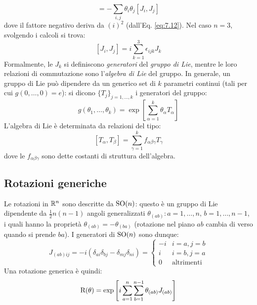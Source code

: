 \begin{equation}
	[\tens{A},\tens{B}] = - \sum_{i,j} \theta_i \theta_j \left[ J_i, J_j \right]
	\label{eq:7.14}
\end{equation}
dove il fattore negativo deriva da $ \left( i \right)^2 $ (dall'Eq. \ref{eq:7.12}).
Nel caso $ n = 3 $, svolgendo i calcoli si trova:
\begin{equation}
	\left[ J_i, J_j \right] = i \sum_{k = 1}^{3} \epsilon_{ijk} J_k
	\label{eq:7.15}
\end{equation}
Formalmente, le $ J_k $ si definiscono \textit{generatori} del \textit{gruppo di Lie}, mentre le loro relazioni di commutazione sono l'\textit{algebra di Lie} del gruppo. In generale, un gruppo di Lie può dipendere da un generico set di $ k $ parametri continui (tali per cui $ g(0,\dots,0) = e $): si dicono $ \{T_j\}_{j = 1,\dots,k} $ i generatori del gruppo:
\begin{equation}
	g(\theta_1, \dots, \theta_k) = \exp \left[ \sum_{\alpha = 1}^{k} \theta_{\alpha} T_{\alpha} \right]
	\label{eq:7.16}
\end{equation}
L'algebra di Lie è determinata da relazioni del tipo:
\begin{equation}
	\left[ T_{\alpha}, T_{\beta} \right] = \sum_{\gamma = 1}^{k} f_{\alpha \beta \gamma} T_{\gamma}
	\label{eq:7.17}
\end{equation}
dove le $ f_{\alpha \beta \gamma} $ sono dette costanti di struttura dell'algebra.

\subsection{Rotazioni generiche}

Le rotazioni in $ \mathbb{R}^n $ sono descritte da $ \mathrm{SO}(n) $: questo è un gruppo di Lie dipendente da $ \frac{1}{2}n(n-1) $ angoli generalizzati $ \theta_{(ab)} : a = 1, \dots, n, \, b = 1, \dots, n-1 $, i quali hanno la proprietà $ \theta_{(ab)} = -\theta_{(ba)} $ (rotazione nel piano $ ab $ cambia di verso quando si prende $ ba $). I generatori di $ \mathrm{SO}(n) $ sono dunque:
\begin{equation}
	J_{(ab)ij} = -i \left( \delta_{ai} \delta_{bj} - \delta_{mj} \delta_{ni} \right) =
	\begin{cases}
		-i & i = a, j = b \\
		i & i = b, j = a \\
		0 & \text{altrimenti}
	\end{cases}
	\label{eq:7.18}
\end{equation}
Una rotazione generica è quindi:
\begin{equation}
	\mathrm{R}(\theta) = \exp \left[ i \sum_{a = 1}^{n} \sum_{b = 1}^{n - 1} \theta_{(ab)} J_{(ab)} \right]
	\label{eq:7.19}
\end{equation}

